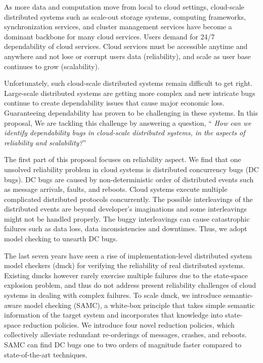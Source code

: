 As more data and computation move from local to cloud settings, cloud-scale
distributed systems such as scale-out storage systems, computing frameworks,
synchronization services, and cluster management services have become a dominant
backbone for many cloud services. Users demand for 24/7 dependability of cloud
services. Cloud services must be accessible anytime and anywhere and not lose or
corrupt users data (reliability), and scale as user base continues to grow
(scalability). 

Unfortunately, such cloud-scale distributed systems remain difficult to get
right. Large-scale distributed systems are getting more complex and new
intricate bugs continue to create dependability issues that cause major economic
loss. Guaranteeing dependability has proven to be challenging in these systems.
In this proposal, We are tackling this challenge by answering a question, ``{\em
How can we identify dependability bugs in cloud-scale distributed systems, in
the aspects of reliability and scalability?}''

The first part of this proposal focuses on reliability aspect. We find that one
unsolved reliability problem in cloud systems is distributed concurrency bugs
(DC bugs). DC bugs are caused by non-deterministic order of distributed events
such as message arrivals, faults, and reboots. Cloud systems execute multiple
complicated distributed protocols concurrently. The possible interleavings of
the distributed events are beyond developer's imaginations and some
interleavings might not be handled properly. The buggy interleavings can cause
catastrophic failures such as data loss, data inconsistencies and downtimes.
Thus, we adopt model checking to unearth DC bugs.

The last seven years have seen a rise of implementation-level distributed system
model checkers (dmck) for verifying the reliability of real distributed systems.
Existing dmcks however rarely exercise multiple failures due to the state-space
explosion problem, and thus do not address present reliability challenges of
cloud systems in dealing with complex failures. To scale dmck, we introduce
semantic-aware model checking (SAMC), a white-box principle that takes simple
semantic information of the target system and incorporates that knowledge into
state-space reduction policies. We introduce four novel reduction policies,
which collectively alleviate redundant re-orderings of messages, crashes, and
reboots. SAMC can find DC bugs one to two orders of magnitude faster compared
to state-of-the-art techniques. 


